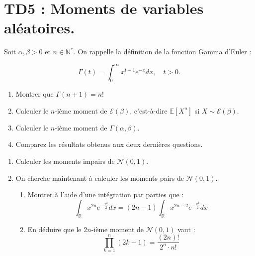 \chapter*{TD5 :  Moments de variables aléatoires.}

\setcounter{exercice}{0}

\medskip
\begin{mdframed}
\begin{exercice}
Soit $\alpha, \beta > 0$ et $n \in \mathbb{N}^*$. On rappelle la définition de la fonction Gamma d'Euler :

$$
\Gamma(t) = \int_0^\infty x^{t-1}e^{-x} dx, \quad t > 0.
$$

\begin{enumerate}
    \item Montrer que $\Gamma(n + 1) = n!$
    \item Calculer le $n$-ième moment de $\mathcal{E}(\beta)$, c'est-à-dire $\mathbb{E}[X^n]$ si $X \sim \mathcal{E}(\beta)$.
    \item Calculer le $n$-ième moment de $\Gamma(\alpha, \beta)$.
    \item Comparez les résultats obtenus aux deux dernières questions.
\end{enumerate}
\end{exercice}
\end{mdframed}

\medskip

\begin{mdframed}
\begin{exercice}
\begin{enumerate}
    \item Calculer les moments impairs de $\mathcal{N}(0, 1)$.
    \item On cherche maintenant à calculer les moments pairs de $\mathcal{N}(0, 1)$.
    \begin{enumerate}
        \item Montrer à l'aide d'une intégration par parties que :
        $$
        \int_{\mathbb{R}} x^{2n}e^{-\frac{x^2}{2}} dx = (2n - 1) \int_{\mathbb{R}} x^{2n-2}e^{-\frac{x^2}{2}} dx
        $$
        \item En déduire que le $2n$-ième moment de $\mathcal{N}(0, 1)$ vaut :
        $$
        \prod_{k=1}^n (2k - 1) = \frac{(2n)!}{2^n \cdot n!}
        $$
    \end{enumerate}
\end{enumerate}
\end{exercice}
\end{mdframed}

